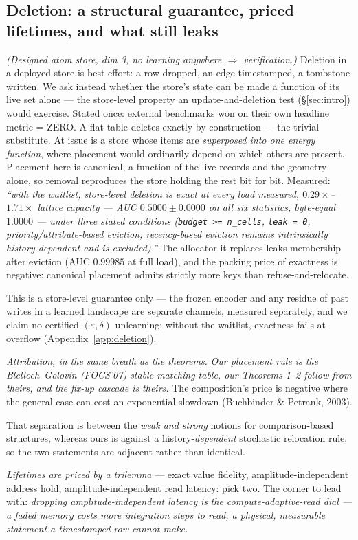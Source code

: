 \documentclass{article}
\begin{document}
\subsection{Deletion: a structural guarantee, priced lifetimes, and what still leaks}\label{sec:deletion}

\emph{(Designed atom store, dim 3, no learning anywhere $\Rightarrow$ verification.)} Deletion in a deployed store is best-effort: a row dropped, an edge timestamped, a tombstone written. We ask instead whether the store's state can be made a function of its live set alone --- the store-level property an update-and-deletion test (\S\ref{sec:intro}) would exercise. Stated once: external benchmarks won on their own headline metric = ZERO. A flat table deletes exactly by construction --- the trivial substitute. At issue is a store whose items are \emph{superposed into one energy function}, where placement would ordinarily depend on which others are present. Placement here is canonical, a function of the live records and the geometry alone, so removal reproduces the store holding the rest bit for bit. Measured: \emph{``with the waitlist, store-level deletion is exact at every load measured, $0.29\times$--$1.71\times$ lattice capacity --- AUC $0.5000\pm0.0000$ on all six statistics, byte-equal $1.0000$ --- under three stated conditions (\texttt{budget >= n\_cells}, \texttt{leak = 0}, priority/attribute-based eviction; recency-based eviction remains intrinsically history-dependent and is excluded).''} The allocator it replaces leaks membership after eviction (AUC $0.99985$ at full load), and the packing price of exactness is negative: canonical placement admits strictly more keys than refuse-and-relocate. { This is a store-level guarantee only --- the frozen encoder and any residue of past writes in a learned landscape are separate channels, measured separately, and we claim no certified $(\varepsilon,\delta)$ unlearning; without the waitlist, exactness fails at overflow (Appendix~\ref{app:deletion}).\par} \emph{Attribution, in the same breath as the theorems.} \emph{Our placement rule is the Blelloch--Golovin (FOCS'07) stable-matching table, our Theorems 1--2 follow from theirs, and the fix-up cascade is theirs.} The composition's price is negative where the general case can cost an exponential slowdown (Buchbinder \& Petrank, 2003). { That separation is between the \emph{weak and strong} notions for comparison-based structures, whereas ours is against a history-\emph{dependent} stochastic relocation rule, so the two statements are adjacent rather than identical.\par} \emph{Lifetimes are priced by a trilemma} --- exact value fidelity, amplitude-independent address hold, amplitude-independent read latency: pick two. The corner to lead with: \emph{dropping amplitude-independent latency} \emph{is} \emph{the compute-adaptive-read dial --- a faded memory costs more integration steps to read, a physical, measurable statement a timestamped row cannot make.}
\end{document}
